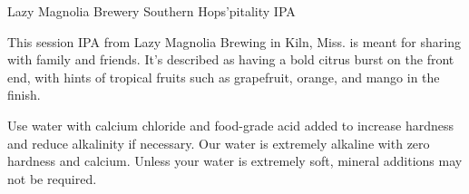 \begin{recipie}{Lazy Magnolia Brewery Southern Hops'pitality IPA}

\begin{aboutblock}
This session IPA from Lazy Magnolia Brewing in Kiln, Miss. is meant for sharing with
family and friends. It's described as having a bold citrus burst on the front end, with
hints of tropical fruits such as grapefruit, orange, and mango in the finish.
\end{aboutblock}


\begin{methodandtiming}
 
\begin{mashsteps}
\end{mashsteps}

\begin{fermentationsteps}
\end{fermentationsteps}

\begin{directions}
Use water with calcium chloride and food-grade acid added to increase hardness and
reduce alkalinity if necessary. Our water is extremely alkaline with zero hardness
and calcium. Unless your water is extremely soft, mineral additions may not be
required.
\end{directions}

\end{methodandtiming}

\pagebreak

\begin{ingredientsblock}

\begin{malts}
\end{malts}

\begin{hops}
\end{hops}

\begin{yeasts}
\end{yeasts}

\end{ingredientsblock}

\end{recipie}

